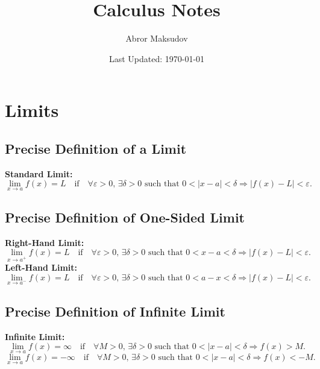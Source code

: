 \documentclass[a4paper,11pt]{article}
\title{Calculus Notes}
\author{Abror Maksudov}
\date{Last Updated: \today}
\begin{document}
\maketitle
\tableofcontents

\section{Limits}




\subsection{Precise Definition of a Limit}

\begin{tcolorbox}
    \textbf{Standard Limit:}  
    \[
    \lim_{x \to a} f(x) = L \quad \text{if} \quad \forall \varepsilon > 0, \, \exists \delta > 0 \text{ such that } 0 < |x - a| < \delta \Rightarrow |f(x) - L| < \varepsilon.
    \]
\end{tcolorbox}



\subsection{Precise Definition of One-Sided Limit}

\begin{tcolorbox}
    \textbf{Right-Hand Limit:}  
    \[
    \lim_{x \to a^+} f(x) = L \quad \text{if} \quad \forall \varepsilon > 0, \, \exists \delta > 0 \text{ such that } 0 < x - a < \delta \Rightarrow |f(x) - L| < \varepsilon.
    \]
    \textbf{Left-Hand Limit:}  
    \[
    \lim_{x \to a^-} f(x) = L \quad \text{if} \quad \forall \varepsilon > 0, \, \exists \delta > 0 \text{ such that } 0 < a - x < \delta \Rightarrow |f(x) - L| < \varepsilon.
    \]
\end{tcolorbox}




\subsection{Precise Definition of Infinite Limit}

\begin{tcolorbox}
    \textbf{Infinite Limit:}  
    \[
    \lim_{x \to a} f(x) = \infty \quad \text{if} \quad \forall M > 0, \, \exists \delta > 0 \text{ such that } 0 < |x - a| < \delta \Rightarrow f(x) > M.
    \]
    \[
    \lim_{x \to a} f(x) = -\infty \quad \text{if} \quad \forall M > 0, \, \exists \delta > 0 \text{ such that } 0 < |x - a| < \delta \Rightarrow f(x) < -M.
    \]
\end{tcolorbox}
\end{document}
